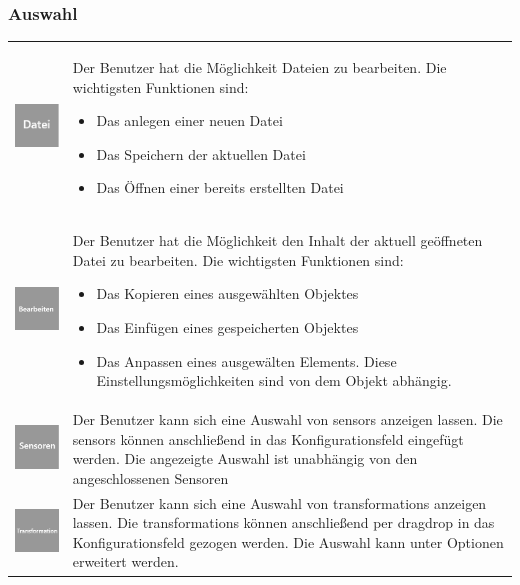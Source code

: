 \documentclass[parskip=full]{scrartcl}
\begin{document}
\subsubsection{Auswahl}

\begin{tabular}[t]{p{1cm} p{10cm}} %
	\vspace{0cm}\includegraphics[width = 1 cm]{Grafik/Datei.png} & Der Benutzer hat die Möglichkeit Dateien zu bearbeiten. Die wichtigsten Funktionen sind:
	\begin{itemize} 
		\item Das anlegen einer neuen Datei
		\item Das Speichern der aktuellen Datei
		\item Das Öffnen einer bereits erstellten Datei
	\end{itemize}\\
	\vspace{0cm}\includegraphics[width = 1 cm]{Grafik/Bearbeiten.png} & Der Benutzer hat die Möglichkeit den Inhalt der aktuell geöffneten Datei zu bearbeiten. Die wichtigsten Funktionen sind:
	\begin{itemize} 
		\item Das Kopieren eines ausgewählten Objektes
		\item Das Einfügen eines gespeicherten Objektes
		\item Das Anpassen eines ausgewälten Elements. Diese Einstellungsmöglichkeiten sind von dem Objekt abhängig.
	\end{itemize}\\
	\vspace{0cm}\includegraphics[width = 1 cm]{Grafik/Sensor.png} & Der Benutzer kann sich eine Auswahl von \glspl{sensor} anzeigen lassen. Die \glspl{sensor} können anschließend in das Konfigurationsfeld eingefügt werden. Die angezeigte Auswahl ist unabhängig von den angeschlossenen Sensoren\newline\\
	\vspace{0cm}\includegraphics[width = 1 cm]{Grafik/Verbindung.png} & Der Benutzer kann sich eine Auswahl von \glspl{transformation} anzeigen lassen. Die \glspl{transformation} können anschließend per \gls{dragdrop} in das Konfigurationsfeld gezogen werden. Die Auswahl kann unter Optionen erweitert werden.\newline\\

\end{tabular}
\end{document}
